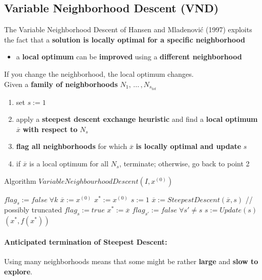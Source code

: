 \newpage

\subsection{Variable Neighborhood Descent (VND)}

The Variable Neighborhood Descent of Hansen and Mladenovi\'c (1997) exploits the fact that a \textbf{solution is locally optimal for a specific neighborhood}
\begin{itemize}
	\item a \textbf{local optimum} can be \textbf{improved} using a \textbf{different neighborhood}
\end{itemize}
If you change the neighborhood, the local optimum changes.\\

Given a \textbf{family of neighborhoods} $N_1, \, ... \, , N_{s_{tot}}$
\begin{enumerate}
	\item set $s := 1$
	\item apply a \textbf{steepest descent exchange heuristic} and find a \textbf{local optimum} $\overline{x}$ \textbf{with respect to} $N_s$
	\item \textbf{flag all neighborhoods} for which $\overline{x}$ \textbf{is locally optimal and update} $s$
	\item if $\overline{x}$ is a local optimum for all $N_s$, terminate; otherwise, go back to point 2
\end{enumerate}

\begin{algorithm}
	\caption{Algorithm $VariableNeighbourhoodDescent(I , x^{(0)})$}
	\begin{algorithmic}
		\STATE $flag_s := false \; \forall k$
		\STATE $\overline{x} := x^{(0)}$ 
		\STATE $x^\ast := x^{(0)}$
		\STATE $s := 1$
		\STATE $\overline{x} := SteepestDescent(\overline{x}, s)$ // possibly truncated
		\STATE $flag_s := true$
		\STATE $x^\ast := \overline{x}$
		\STATE $flag_{s'} := false \; \forall s' \neq s$
		\ENDIF
		\STATE $s := Update(s)$
		\ENDWHILE
		\RETURN $(x^\ast, f (x^\ast))$
	\end{algorithmic}
\end{algorithm}

\newpage

\paragraph{Anticipated termination of Steepest Descent:} Using many neighborhoods means that some might be rather \textbf{large} and \textbf{slow to explore}.\\

